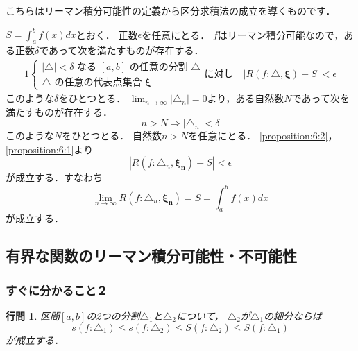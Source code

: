\documentclass{jsarticle}
\makeatletter
\renewenvironment{proof}[1][\proofname]{\par
        \pushQED{\qed}
        \normalfont
        \topsep6\p@\@plus6\p@ \trivlist
        \item[\hskip\labelsep{\bfseries #1}\@addpunct{\bfseries}]\ignorespaces
    }{%
        \popQED\endtrivlist\@endpefalse
    }
\renewcommand{\proofname}{\underline{証明.}}
\newtheorem{proposition}{行間}
\makeatother
\begin{document}
こちらはリーマン積分可能性の定義から区分求積法の成立を導くものです．

\begin{proof}
    $S = \int_a^b f(x) dx$とおく．
    正数$\epsilon$を任意にとる．
    $f$はリーマン積分可能なので，ある正数$\delta$であって次を満たすものが存在する．
    \begin{alignat}{1}
        \begin{cases}
            |\triangle| < \delta \mbox{ なる } [a, b] \mbox{ の任意の分割 } \triangle \\
            \triangle \mbox{ の任意の代表点集合 } \mathbf{\xi}
        \end{cases}
        \mbox{に対し} \quad
        |R(f: \triangle, \mathbf{\xi}) - S| < \epsilon
        \label{proposition:6:1}
    \end{alignat}
    このような$\delta$をひとつとる．
    $\lim_{n\rightarrow\infty} |\triangle_n| = 0$より，ある自然数$N$であって次を満たすものが存在する．
    \begin{equation}
        n > N \Longrightarrow |\triangle_n| < \delta
        \label{proposition:6:2}
    \end{equation}
    このような$N$をひとつとる．
    自然数$n > N$を任意にとる．
    \cref{proposition:6:2}，\cref{proposition:6:1}より
    \begin{equation}
        |R(f: \triangle_n, \mathbf{\xi_n}) - S| < \epsilon
    \end{equation}
    が成立する．すなわち
    \begin{equation}
        \lim_{n\rightarrow\infty} R(f: \triangle_n, \mathbf{\xi_n})
        =
        S
        =
        \int_a^b f(x) dx
    \end{equation}
    が成立する．
\end{proof}

\setcounter{subsection}{3}
\subsection{有界な関数のリーマン積分可能性・不可能性}
\subsubsection{すぐに分かること２}
\begin{screen}
    \begin{proposition}
        区間$[a, b]$の2つの分割$\triangle_1$と$\triangle_2$について，
        $\triangle_2$が$\triangle_1$の細分ならば
        \begin{equation}
            s(f:\triangle_1) \leq s(f:\triangle_2) \leq S(f: \triangle_2) \leq S(f: \triangle_1)
            \label{proposition:7}
        \end{equation}
        が成立する．
    \end{proposition}
\end{screen}
\end{document}
